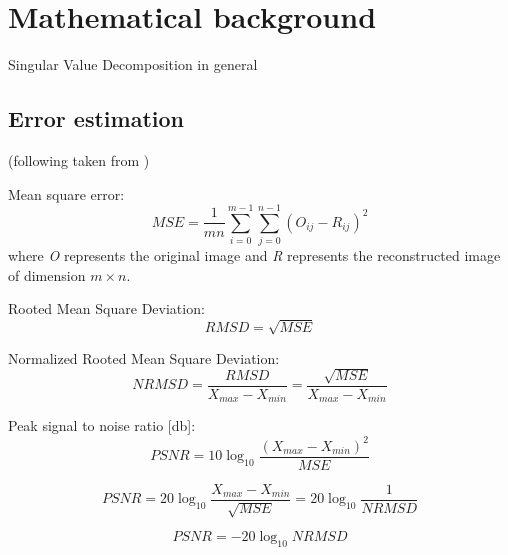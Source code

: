 \section{Mathematical background}
\label{sec:math}

Singular Value Decomposition in general


\subsection{Error estimation}

(following taken from \cite{SairaBanu2015})

Mean square error:
$$MSE=\frac{1}{m n} \sum_{i=0}^{m-1} \sum_{j=0}^{n-1} (O_{ij} - R_{ij})^{2}$$
where \textit{O} represents the original image and \textit{R} represents the
reconstructed image of dimension $m \times n$.

Rooted Mean Square Deviation:
$$RMSD=\sqrt{MSE}$$

Normalized Rooted Mean Square Deviation:
$$NRMSD=\frac{RMSD}{X_{max}-X_{min}}=\frac{\sqrt{MSE}}{X_{max}-X_{min}}$$

Peak signal to noise ratio [db]:
$$PSNR=10\log_{10}\frac{(X_{max}-X_{min})^{2}}{MSE}$$

$$PSNR=20\log_{10}\frac{X_{max}-X_{min}}{\sqrt{MSE}}=20\log_{10}\frac{1}{NRMSD}$$

$$PSNR=-20\log_{10}NRMSD$$


